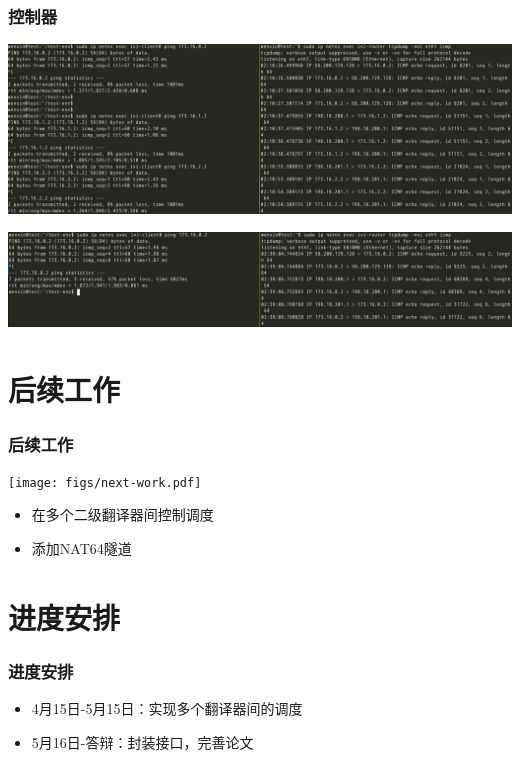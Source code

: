 \documentclass{beamer}
\begin{document}
\begin{frame}
  \frametitle{控制器}

  \begin{center}
    \includegraphics[width=\textwidth]{figs/static.jpeg}
  \end{center}

  \begin{center}
    \includegraphics[width=\textwidth]{figs/round-robin.jpeg}  
  \end{center}
  
\end{frame}

\section{后续工作}
\begin{frame}
  \frametitle{后续工作}

  \begin{center}
    \texttt{[image: figs/next-work.pdf]}  
  \end{center}
  \begin{block}{}
    \begin{itemize}
    \item 在多个二级翻译器间控制调度
    \item 添加NAT64隧道
    \end{itemize}
  \end{block}
\end{frame}

\section{进度安排}

\begin{frame}
  \frametitle{进度安排}
  \begin{block}{}
    \begin{itemize}
    \item 4月15日-5月15日：实现多个翻译器间的调度
    \item 5月16日-答辩：封装接口，完善论文
    \end{itemize}
  \end{block}
\end{frame}
\end{document}
